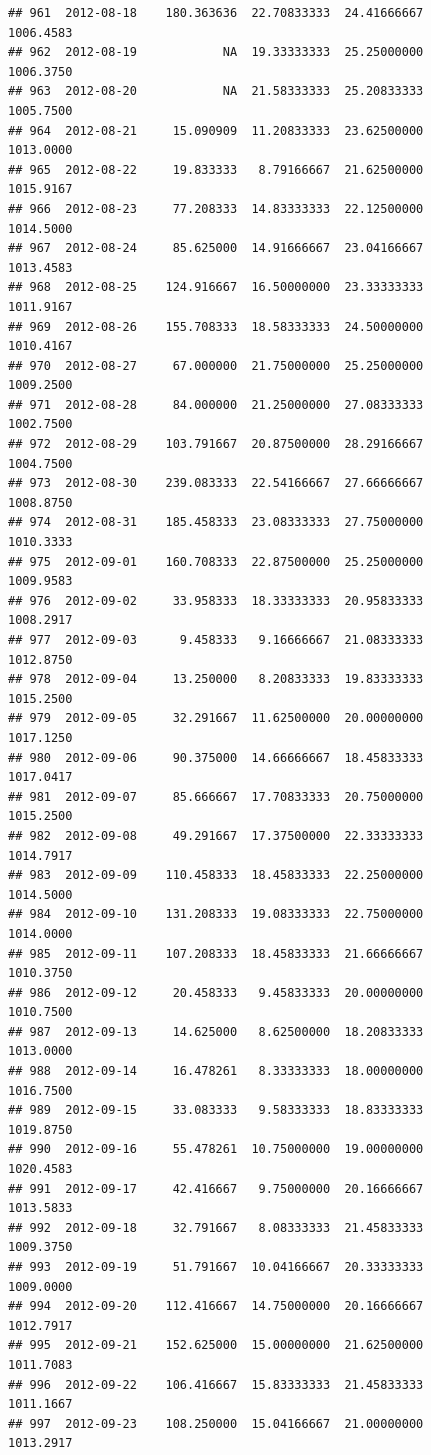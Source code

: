 \documentclass[
]{article}
\begin{document}
\begin{verbatim}
## 961  2012-08-18    180.363636  22.70833333  24.41666667    1006.4583
## 962  2012-08-19            NA  19.33333333  25.25000000    1006.3750
## 963  2012-08-20            NA  21.58333333  25.20833333    1005.7500
## 964  2012-08-21     15.090909  11.20833333  23.62500000    1013.0000
## 965  2012-08-22     19.833333   8.79166667  21.62500000    1015.9167
## 966  2012-08-23     77.208333  14.83333333  22.12500000    1014.5000
## 967  2012-08-24     85.625000  14.91666667  23.04166667    1013.4583
## 968  2012-08-25    124.916667  16.50000000  23.33333333    1011.9167
## 969  2012-08-26    155.708333  18.58333333  24.50000000    1010.4167
## 970  2012-08-27     67.000000  21.75000000  25.25000000    1009.2500
## 971  2012-08-28     84.000000  21.25000000  27.08333333    1002.7500
## 972  2012-08-29    103.791667  20.87500000  28.29166667    1004.7500
## 973  2012-08-30    239.083333  22.54166667  27.66666667    1008.8750
## 974  2012-08-31    185.458333  23.08333333  27.75000000    1010.3333
## 975  2012-09-01    160.708333  22.87500000  25.25000000    1009.9583
## 976  2012-09-02     33.958333  18.33333333  20.95833333    1008.2917
## 977  2012-09-03      9.458333   9.16666667  21.08333333    1012.8750
## 978  2012-09-04     13.250000   8.20833333  19.83333333    1015.2500
## 979  2012-09-05     32.291667  11.62500000  20.00000000    1017.1250
## 980  2012-09-06     90.375000  14.66666667  18.45833333    1017.0417
## 981  2012-09-07     85.666667  17.70833333  20.75000000    1015.2500
## 982  2012-09-08     49.291667  17.37500000  22.33333333    1014.7917
## 983  2012-09-09    110.458333  18.45833333  22.25000000    1014.5000
## 984  2012-09-10    131.208333  19.08333333  22.75000000    1014.0000
## 985  2012-09-11    107.208333  18.45833333  21.66666667    1010.3750
## 986  2012-09-12     20.458333   9.45833333  20.00000000    1010.7500
## 987  2012-09-13     14.625000   8.62500000  18.20833333    1013.0000
## 988  2012-09-14     16.478261   8.33333333  18.00000000    1016.7500
## 989  2012-09-15     33.083333   9.58333333  18.83333333    1019.8750
## 990  2012-09-16     55.478261  10.75000000  19.00000000    1020.4583
## 991  2012-09-17     42.416667   9.75000000  20.16666667    1013.5833
## 992  2012-09-18     32.791667   8.08333333  21.45833333    1009.3750
## 993  2012-09-19     51.791667  10.04166667  20.33333333    1009.0000
## 994  2012-09-20    112.416667  14.75000000  20.16666667    1012.7917
## 995  2012-09-21    152.625000  15.00000000  21.62500000    1011.7083
## 996  2012-09-22    106.416667  15.83333333  21.45833333    1011.1667
## 997  2012-09-23    108.250000  15.04166667  21.00000000    1013.2917

\end{verbatim}
\end{document}

